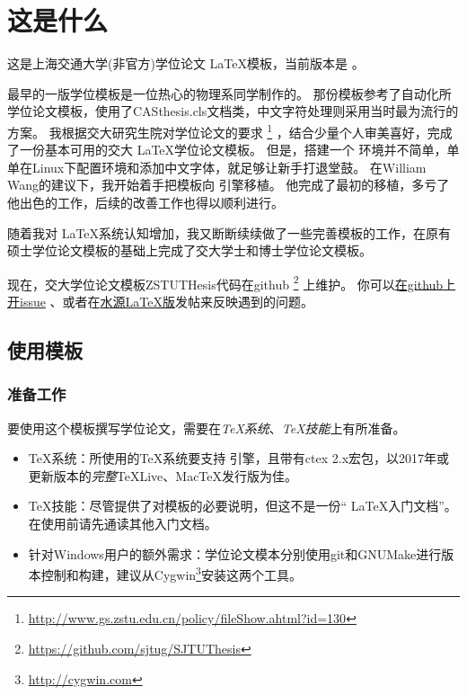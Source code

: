 
\chapter{这是什么}
\label{chap:intro}

这是上海交通大学(非官方)学位论文 \LaTeX 模板，当前版本是 \version 。

最早的一版学位模板是一位热心的物理系同学制作的。
那份模板参考了自动化所学位论文模板，使用了CASthesis.cls文档类，中文字符处理则采用当时最为流行的 \CJKLaTeX 方案。
我根据交大研究生院对学位论文的要求
\footnote{\url{http://www.gs.zstu.edu.cn/policy/fileShow.ahtml?id=130}}
，结合少量个人审美喜好，完成了一份基本可用的交大 \LaTeX 学位论文模板。
但是，搭建一个 \CJKLaTeX 环境并不简单，单单在Linux下配置环境和添加中文字体，就足够让新手打退堂鼓。
在William Wang的建议下，我开始着手把模板向 \XeTeX 引擎移植。
他完成了最初的移植，多亏了他出色的工作，后续的改善工作也得以顺利进行。

随着我对 \LaTeX 系统认知增加，我又断断续续做了一些完善模板的工作，在原有硕士学位论文模板的基础上完成了交大学士和博士学位论文模板。

现在，交大学位论文模板ZSTUTHesis代码在github
\footnote{\url{https://github.com/sjtug/SJTUThesis}}
上维护。
你可以\href{https://github.com/sjtug/SJTUThesis/issues}{在github上开issue}
、或者在\href{https://bbs.sjtu.edu.cn/bbsdoc?board=TeX_LaTeX}{水源LaTeX版}发帖来反映遇到的问题。

\section{使用模板}

\subsection{准备工作}
\label{sec:requirements}

要使用这个模板撰写学位论文，需要在\emph{TeX系统}、\emph{TeX技能}上有所准备。

\begin{itemize}[noitemsep,topsep=0pt,parsep=0pt,partopsep=0pt]
	\item {\TeX}系统：所使用的{\TeX}系统要支持 \XeTeX 引擎，且带有ctex 2.x宏包，以2017年或更新版本的\emph{完整}TeXLive、MacTeX发行版为佳。
	\item TeX技能：尽管提供了对模板的必要说明，但这不是一份“ \LaTeX 入门文档”。在使用前请先通读其他入门文档。
	\item 针对Windows用户的额外需求：学位论文模本分别使用git和GNUMake进行版本控制和构建，建议从Cygwin\footnote{\url{http://cygwin.com}}安装这两个工具。
\end{itemize}

